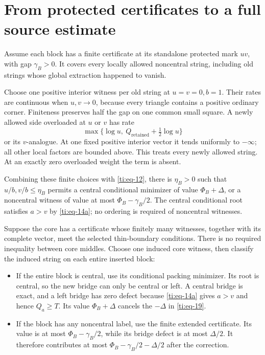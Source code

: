 \documentclass[11pt]{article}
\numberwithin{equation}{section}
\theoremstyle{definition}\newtheorem{definition}[theorem]{Definition}
\theoremstyle{remark}\newtheorem{remark}[theorem]{Remark}
\begin{document}
\section{From protected certificates to a full source estimate}\label{ti:sec-6}

Assume each block has a finite certificate at its standalone protected mark \(uv\), with gap \(\gamma_B>0\). It covers every locally allowed noncentral string, including old strings whose global extraction happened to vanish.

Choose one positive interior witness per old string at \(u=v=0,b=1\). Their rates are continuous when \(u,v\to0\), because every triangle contains a positive ordinary corner. Finiteness preserves half the gap on one common small square. A newly allowed side overloaded at \(u\) or \(v\) has rate
\[
\max\{\log u,\ Q_{\mathrm{retained}}+\tfrac12\log u\}
\]
or its \(v\)-analogue. At one fixed positive interior vector it tends uniformly to \(-\infty\); all other local factors are bounded above. This treats every newly allowed string. At an exactly zero overloaded weight the term is absent.

Combining these finite choices with \eqref{ti:eq-12}, there is \(\eta_B>0\) such that \(u/b,v/b\le\eta_B\) permits a central conditional minimizer of value \(\Phi_B+\Delta\), or a noncentral witness of value at most \(\Phi_B-\gamma_B/2\). The central conditional root satisfies \(a>v\) by \eqref{ti:eq-14a}; no ordering is required of noncentral witnesses.

Suppose the core has a certificate whose finitely many witnesses, together with its complete vector, meet the selected thin-boundary conditions. There is no required inequality between core middles. Choose one induced core witness, then classify the induced string on each entire inserted block:

\begin{itemize}
\item
  If the entire block is central, use its conditional packing minimizer. Its root is central, so the new bridge can only be central or left. A central bridge is exact, and a left bridge has zero defect because \eqref{ti:eq-14a} gives \(a>v\) and hence \(Q_a\ge T\). Its value \(\Phi_B+\Delta\) cancels the \(-\Delta\) in \eqref{ti:eq-19}.
\item
  If the block has any noncentral label, use the finite extended certificate. Its value is at most \(\Phi_B-\gamma_B/2\), while its bridge defect is at most \(\Delta/2\). It therefore contributes at most \(\Phi_B-\gamma_B/2-\Delta/2\) after the correction.
\end{itemize}
\end{document}

